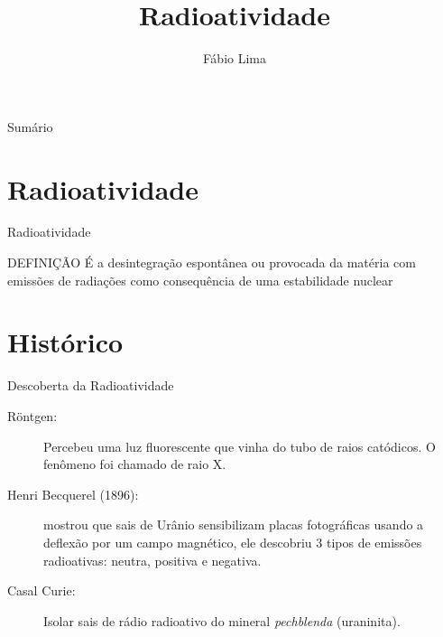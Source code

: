 \documentclass[presentation,professionalfonts,aspectratio=169]{beamer}
\date{}
\author{Fábio Lima}
\date{}
\title{ Radioatividade}
\begin{document}
\begingroup
  \maketitle
  \endgroup
\begin{frame}{Sumário}
\tableofcontents
\end{frame}


\section{Radioatividade}
\label{sec:org4f0da8e}

\begin{frame}[label={sec:org37a9c2a}]{Radioatividade}
\begin{bclogo}[logo=\bcdanger]{DEFINIÇÃO}
É a desintegração espontânea ou provocada da matéria com emissões de radiações como consequência de uma estabilidade nuclear
\end{bclogo}
\end{frame}


\section{Histórico}
\label{sec:org70fa2d8}

\begin{frame}[label={sec:orgfe4ce01}]{Descoberta da Radioatividade}
\begin{description}
\item[{Röntgen:}] Percebeu uma luz fluorescente que vinha do tubo de raios catódicos. O fenômeno foi chamado de raio X.
\item[{Henri Becquerel (1896):}] mostrou que sais de Urânio sensibilizam placas fotográficas usando  a deflexão por um campo magnético, ele descobriu 3 tipos de emissões radioativas: \alert{neutra}, \alert{positiva} e \alert{negativa}.
\item[{Casal Curie:}] Isolar sais de rádio radioativo do mineral \emph{pechblenda} (uraninita).
\end{description}
\end{frame}
\end{document}
